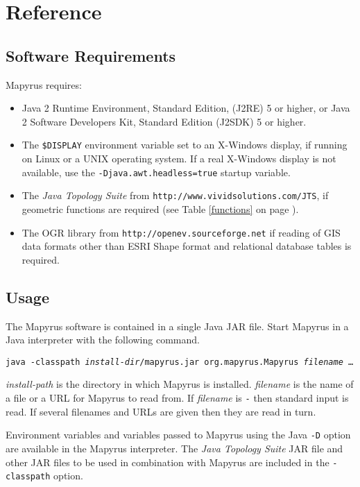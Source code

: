 
\section{Reference}

\subsection{Software Requirements}

Mapyrus requires:
\begin{itemize}
\item
Java 2 Runtime Environment, Standard Edition, (J2RE) 5 or higher,
or Java 2 Software Developers Kit, Standard Edition (J2SDK) 5 or higher.
\item
The \texttt{\$DISPLAY} environment variable set to an X-Windows display,
if running on Linux or a UNIX operating system.  If a real X-Windows display
is not available, use the \texttt{-Djava.awt.headless=true} startup variable.
\item
The \textit{Java Topology Suite} from \texttt{http://www.vividsolutions.com/JTS},
if geometric functions are required
(see Table \ref{functions} on page \pageref{functions}).
\item
The OGR library from
\texttt{http://openev.sourceforge.net}
if reading of GIS data formats other than ESRI Shape format
and relational database tables is required.
\end{itemize}

\subsection{Usage}

The Mapyrus software is contained in a single Java JAR file.
Start Mapyrus in a Java interpreter with the following command.

\vspace{10pt}
\texttt{java -classpath \textit{install-dir}/mapyrus.jar org.mapyrus.Mapyrus \textit{filename} \dots}
\vspace{10pt}

\textit{install-path} is the directory in which
Mapyrus is installed.  \textit{filename} is the name of a file
or a URL for Mapyrus to read from.  If \textit{filename} is \texttt{-}
then standard input is read.  If several filenames and URLs are
given then they are read in turn.

Environment variables
and variables passed to Mapyrus using the Java \texttt{-D} option
are available in the Mapyrus interpreter.  The
\textit{Java Topology Suite} JAR file and other JAR files
to be used in combination with Mapyrus are included in the
\texttt{-classpath} option.

